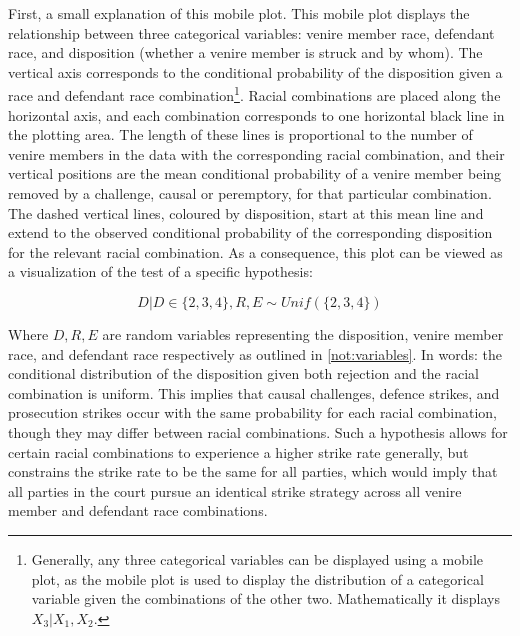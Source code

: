 First, a small explanation of this mobile plot. This mobile plot displays the relationship between three categorical variables:
venire member race, defendant race, and disposition (whether a venire member is struck and by whom). The vertical axis corresponds
to the conditional probability of the disposition given a race and defendant race combination\footnote{Generally, any three
  categorical variables can be displayed using a mobile plot, as the mobile plot is used to display the distribution of a
  categorical variable given the combinations of the other two. Mathematically it displays $X_3|X_1,X_2$.}. Racial combinations
are placed along the horizontal axis, and each combination corresponds to one horizontal black line in the plotting area. The
length of these lines is proportional to the number of venire members in the data with the corresponding racial combination, and
their vertical positions are the mean conditional probability of a venire member being removed by a challenge, causal or
peremptory, for that particular combination. The dashed vertical lines, coloured by disposition, start at this mean line and
extend to the observed conditional probability of the corresponding disposition for the relevant racial combination. As a
consequence, this plot can be viewed as a visualization of the test of a specific hypothesis:

\begin{equation}
  \label{eq:vishyp}
  D | D \in \{2,3,4\}, R, E \sim Unif(\{2,3,4\})
\end{equation}

Where $D, R, E$ are random variables representing the disposition, venire member race, and defendant race respectively as outlined
in \ref{not:variables}. In words: the conditional distribution of the disposition given both rejection and the racial combination
is uniform. This implies that causal challenges, defence strikes, and prosecution strikes occur with the same probability for each
racial combination, though they may differ between racial combinations. Such a hypothesis allows for certain racial combinations
to experience a higher strike rate generally, but constrains the strike rate to be the same for all parties, which would imply
that all parties in the court pursue an identical strike strategy across all venire member and defendant race combinations.

